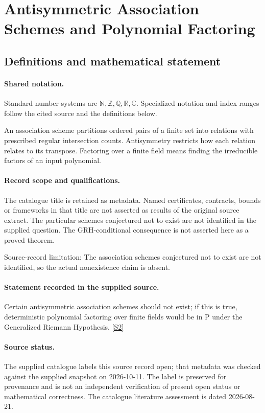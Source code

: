 \documentclass[11pt]{article}
\newcommand{\sref}[2]{\hyperlink{source:#1:#2}{[S#2]}}
\begin{document}
\section{Antisymmetric Association Schemes and Polynomial Factoring}\label{statement}

\subsection{Definitions and mathematical statement}

\paragraph{Shared notation.}Standard number systems are $\mathbb N,\mathbb Z,\mathbb Q,\mathbb R,\mathbb C$. Specialized notation and index ranges follow the cited source and the definitions below.


An association scheme partitions ordered pairs of a finite set into relations with prescribed regular intersection counts. Antisymmetry restricts how each relation relates to its transpose. Factoring over a finite field means finding the irreducible factors of an input polynomial.
\paragraph{Record scope and qualifications.}
The catalogue title is retained as metadata. Named certificates, contracts, bounds or frameworks in that title are not asserted as results of the original source extract.
The particular schemes conjectured not to exist are not identified in the supplied question. The GRH-conditional consequence is not asserted here as a proved theorem.

Source-record limitation: The association schemes conjectured not to exist are not identified, so the actual nonexistence claim is absent.
\paragraph{Statement recorded in the supplied source.}
Certain antisymmetric association schemes should not exist; if this is true, deterministic polynomial factoring over finite fields would be in $\mathrm{P}$ under the Generalized Riemann Hypothesis. \sref{statement}{2}
\paragraph{Source status.}
The supplied catalogue labels this source record open; that metadata was checked against the supplied snapshot on 2026-10-11. The label is preserved for provenance and is not an independent verification of present open status or mathematical correctness. The catalogue literature assessment is dated 2026-08-21.
\end{document}
